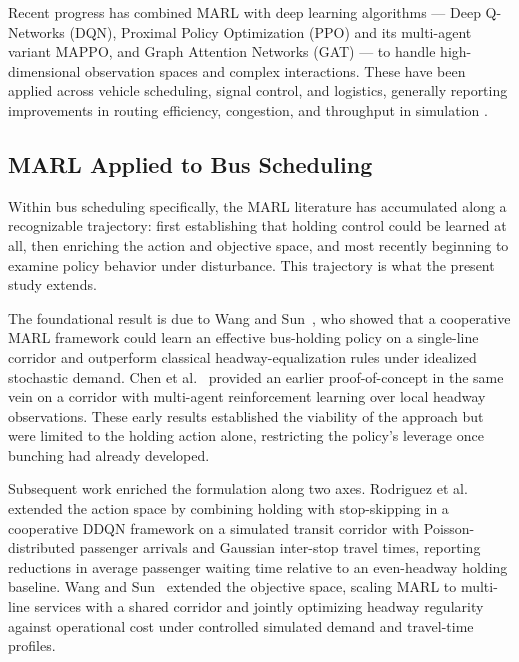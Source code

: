 Recent progress has combined MARL with deep learning algorithms --- Deep Q-Networks (DQN), Proximal Policy Optimization (PPO) and its multi-agent variant MAPPO, and Graph Attention Networks (GAT) --- to handle high-dimensional observation spaces and complex interactions. These have been applied across vehicle scheduling, signal control, and logistics, generally reporting improvements in routing efficiency, congestion, and throughput in simulation \cite{Li2023Departure,Cao2022Train,Wang2024MultiAGV,Sun2024Graph,Zuo2026AGV,Huang2025Joint,Bokade2023MARL}.

\subsection{MARL Applied to Bus Scheduling}
\label{subsec:marl-applied}
Within bus scheduling specifically, the MARL literature has accumulated along a recognizable trajectory: first establishing that holding control could be learned at all, then enriching the action and objective space, and most recently beginning to examine policy behavior under disturbance. This trajectory is what the present study extends.

The foundational result is due to Wang and Sun~\cite{Wang2020Holding}, who showed that a cooperative MARL framework could learn an effective bus-holding policy on a single-line corridor and outperform classical headway-equalization rules under idealized stochastic demand. Chen et al.~\cite{Chen2016MARLBus} provided an earlier proof-of-concept in the same vein on a corridor with multi-agent reinforcement learning over local headway observations. These early results established the viability of the approach but were limited to the holding action alone, restricting the policy's leverage once bunching had already developed.

Subsequent work enriched the formulation along two axes. Rodriguez et al.~\cite{Rodriguez2023Cooperative} extended the action space by combining holding with stop-skipping in a cooperative DDQN framework on a simulated transit corridor with Poisson-distributed passenger arrivals and Gaussian inter-stop travel times, reporting reductions in average passenger waiting time relative to an even-headway holding baseline. Wang and Sun~\cite{Wang2023MultiObj} extended the objective space, scaling MARL to multi-line services with a shared corridor and jointly optimizing headway regularity against operational cost under controlled simulated demand and travel-time profiles.

